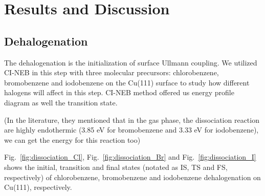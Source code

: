 \documentclass[%
 reprint,
 amsmath,amssymb,
 aps,
prb,
]{revtex4-1}
\newcommand{\angstrom}{\textup{\AA}}
\begin{document}


\section{Results and Discussion}

\subsection{Dehalogenation}

The dehalogenation is the initialization of surface Ullmann coupling. 
We utilized CI-NEB in this step with three molecular precursors: chlorobenzene, bromobenzene and iodobenzene on the Cu(111) surface to study how different halogens will affect in this step. CI-NEB method offered us energy profile diagram as well the transition state.

(In the literature, they mentioned that in the gas phase, the dissociation reaction are highly endothermic (3.85 eV for bromobenzene and 3.33 eV for iodobenzene), we can get the energy for this reaction too)

Fig.~\ref{fig:dissociation_Cl}, Fig.~\ref{fig:dissociation_Br} and Fig.~\ref{fig:dissociation_I} shows the initial, transition and final states (notated as IS, TS and FS, respectively) of chlorobenzene, bromobenzene and iodobenzene dehalogenation on Cu(111), respectively. 
\end{document}
